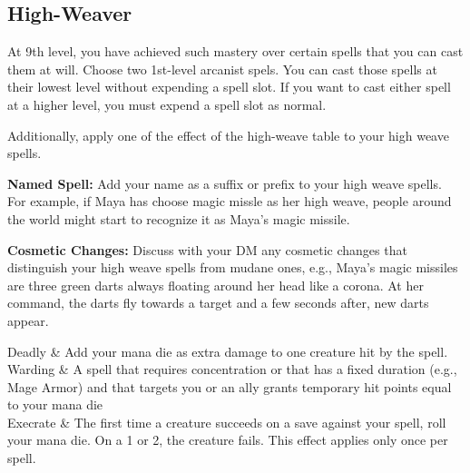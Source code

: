\begin{multicols*}{2}
\subsection*{High-Weaver}

At 9th level, you have achieved such mastery over certain spells that you can cast them at will. Choose two 1st-level arcanist spels. You can cast those spells at their lowest level without expending a spell slot. If you want to cast either spell at a higher level, you must expend a spell slot as normal.

Additionally, apply one of the effect of the high-weave table to your high weave spells.

\textbf{Named Spell:} Add your name as a suffix or prefix to your high weave spells. For example, if Maya has choose 
magic missle as her high weave, people around the world might start to recognize it as Maya's magic missile. 


\textbf{Cosmetic Changes:} Discuss with your DM any cosmetic changes that distinguish your high weave spells from mudane ones, e.g., Maya's magic missiles are three green darts always floating around her head like a corona. At her command, the darts fly towards a target and a few seconds after, new darts appear.


\begin{rpg-table}
		Deadly  & Add your mana die as extra damage to one creature hit by the spell.  \\
		Warding  & A spell that requires concentration or that has a fixed duration (e.g., Mage Armor) and that targets you or an ally grants temporary hit points equal to your mana die \\
	Execrate  & The first time a creature succeeds on a save against your spell, roll your mana die. On a 1 or 2, the creature fails. This effect applies only once per spell. \\
\end{rpg-table}	


\end{multicols*}
